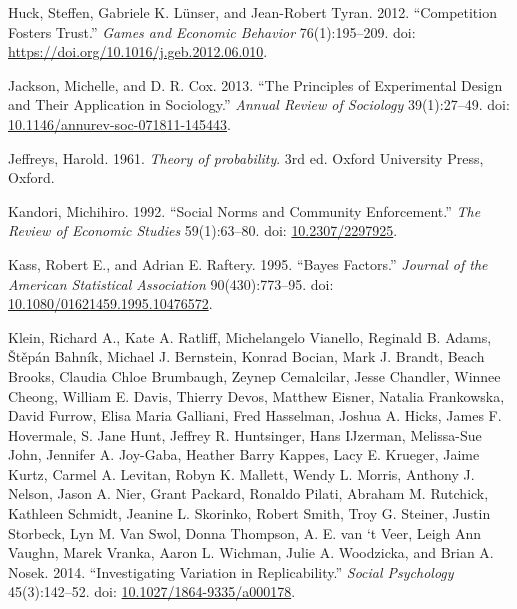 \documentclass[
  11pt,
]{article}
\newlength{\cslhangindent}
\newlength{\cslentryspacingunit} %
\newenvironment{CSLReferences}[2] %
 {%
  \setlength{\parindent}{0pt}
  \ifodd #1
  \let\oldpar\par
  \def\par{\hangindent=\cslhangindent\oldpar}
  \fi
  \setlength{\parskip}{#2\cslentryspacingunit}
 }%
 {}
\begin{document}
\begin{CSLReferences}{1}{0}
\leavevmode{}%
Huck, Steffen, Gabriele K. Lünser, and Jean-Robert Tyran. 2012. {``Competition Fosters Trust.''} \emph{Games and Economic Behavior} 76(1):195--209. doi: \url{https://doi.org/10.1016/j.geb.2012.06.010}.

\leavevmode{}%
Jackson, Michelle, and D. R. Cox. 2013. {``The Principles of Experimental Design and Their Application in Sociology.''} \emph{Annual Review of Sociology} 39(1):27--49. doi: \href{https://doi.org/10.1146/annurev-soc-071811-145443}{10.1146/annurev-soc-071811-145443}.

\leavevmode{}%
Jeffreys, Harold. 1961. \emph{{Theory of probability}}. 3rd ed. Oxford University Press, Oxford.

\leavevmode{}%
Kandori, Michihiro. 1992. {``{Social Norms and Community Enforcement}.''} \emph{The Review of Economic Studies} 59(1):63--80. doi: \href{https://doi.org/10.2307/2297925}{10.2307/2297925}.

\leavevmode{}%
Kass, Robert E., and Adrian E. Raftery. 1995. {``Bayes Factors.''} \emph{Journal of the American Statistical Association} 90(430):773--95. doi: \href{https://doi.org/10.1080/01621459.1995.10476572}{10.1080/01621459.1995.10476572}.

\leavevmode{}%
Klein, Richard A., Kate A. Ratliff, Michelangelo Vianello, Reginald B. Adams, Štěpán Bahník, Michael J. Bernstein, Konrad Bocian, Mark J. Brandt, Beach Brooks, Claudia Chloe Brumbaugh, Zeynep Cemalcilar, Jesse Chandler, Winnee Cheong, William E. Davis, Thierry Devos, Matthew Eisner, Natalia Frankowska, David Furrow, Elisa Maria Galliani, Fred Hasselman, Joshua A. Hicks, James F. Hovermale, S. Jane Hunt, Jeffrey R. Huntsinger, Hans IJzerman, Melissa-Sue John, Jennifer A. Joy-Gaba, Heather Barry Kappes, Lacy E. Krueger, Jaime Kurtz, Carmel A. Levitan, Robyn K. Mallett, Wendy L. Morris, Anthony J. Nelson, Jason A. Nier, Grant Packard, Ronaldo Pilati, Abraham M. Rutchick, Kathleen Schmidt, Jeanine L. Skorinko, Robert Smith, Troy G. Steiner, Justin Storbeck, Lyn M. Van Swol, Donna Thompson, A. E. van `t Veer, Leigh Ann Vaughn, Marek Vranka, Aaron L. Wichman, Julie A. Woodzicka, and Brian A. Nosek. 2014. {``Investigating Variation in Replicability.''} \emph{Social Psychology} 45(3):142--52. doi: \href{https://doi.org/10.1027/1864-9335/a000178}{10.1027/1864-9335/a000178}.


\end{CSLReferences}
\end{document}
